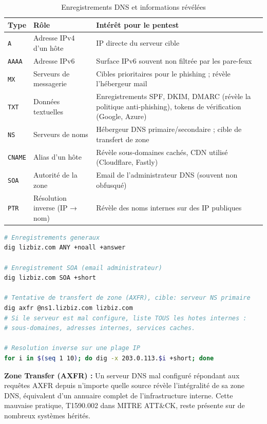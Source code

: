 \begin{table}[htbp]
\centering
\caption{Enregistrements DNS et informations révélées}
\label{tab:dns_records}
\begin{tabular}{p{1.8cm}p{4cm}p{7cm}}
\toprule
\textbf{Type} & \textbf{Rôle} & \textbf{Intérêt pour le pentest} \\
\midrule
\texttt{A}
    & Adresse IPv4 d'un hôte
    & IP directe du serveur cible \\
\addlinespace
\texttt{AAAA}
    & Adresse IPv6
    & Surface IPv6 souvent non filtrée par les pare-feux \\
\addlinespace
\texttt{MX}
    & Serveurs de messagerie
    & Cibles prioritaires pour le phishing ; révèle l'hébergeur mail \\
\addlinespace
\texttt{TXT}
    & Données textuelles
    & Enregistrements SPF, DKIM, DMARC (révèle la politique anti-phishing),
      tokens de vérification (Google, Azure) \\
\addlinespace
\texttt{NS}
    & Serveurs de noms
    & Hébergeur DNS primaire/secondaire ; cible de transfert de zone \\
\addlinespace
\texttt{CNAME}
    & Alias d'un hôte
    & Révèle sous-domaines cachés, CDN utilisé (Cloudflare, Fastly) \\
\addlinespace
\texttt{SOA}
    & Autorité de la zone
    & Email de l'administrateur DNS (souvent non obfusqué) \\
\addlinespace
\texttt{PTR}
    & Résolution inverse (IP → nom)
    & Révèle des noms internes sur des IP publiques \\
\bottomrule
\end{tabular}
\end{table}

\begin{lstlisting}[language=bash, caption={Énumération DNS complète avec dig}]
# Enregistrements generaux
dig lizbiz.com ANY +noall +answer

# Enregistrement SOA (email administrateur)
dig lizbiz.com SOA +short

# Tentative de transfert de zone (AXFR), cible: serveur NS primaire
dig axfr @ns1.lizbiz.com lizbiz.com
# Si le serveur est mal configure, liste TOUS les hotes internes :
# sous-domaines, adresses internes, services caches.

# Resolution inverse sur une plage IP
for i in $(seq 1 10); do dig -x 203.0.113.$i +short; done
\end{lstlisting}

\begin{boxalert}
\textbf{Zone Transfer (AXFR) :} Un serveur DNS mal configuré répondant aux
requêtes AXFR depuis n'importe quelle source révèle l'intégralité de sa zone
DNS, équivalent d'un annuaire complet de l'infrastructure interne. Cette
mauvaise pratique, T1590.002 dans MITRE ATT\&CK, reste présente sur de
nombreux systèmes hérités.
\end{boxalert}

